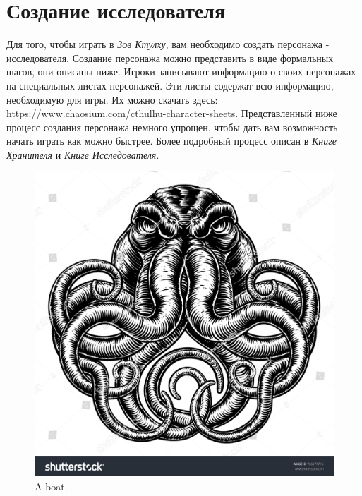 \documentclass[letterpaper,twocolumn,openany, twoside, 11pt, usenames]{cocbook}
\begin{document}
\section*{\nohyphens{Создание исследователя}}

Для того, чтобы играть в {\it Зов Ктулху}, вам необходимо создать персонажа - исследователя. Создание персонажа можно представить в виде формальных шагов, они описаны ниже. Игроки записывают информацию о своих персонажах на специальных листах персонажей. Эти листы содержат всю информацию, необходимую для игры. Их можно скачать здесь: https://www.chaosium.com/cthulhu-character-sheets.
Представленный ниже процесс создания персонажа немного упрощен, чтобы дать вам возможность начать играть как можно быстрее. Более подробный процесс описан в {\it Книге Хранителя} и {\it Книге Исследователя}.

\begin{figure}
  \includegraphics[width=\linewidth]{img/cthulhu.jpg}
  \caption{A boat.}
  \label{fig:boat1}
\end{figure}

\begin{figure}
\setthemecolor[CoCPaperBox]

\end{figure}
\end{document}
